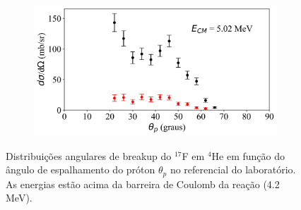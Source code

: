 \documentclass[a4paper,12pt,oneside]{book}
\begin{document}
\begin{figure}[H]
\begin{subfigure}[b]{0.48\textwidth}
        \caption{}
        \label{subfig:dist_ang_f}
    \end{subfigure}
    \begin{subfigure}[b]{0.49\textwidth}
        \centering
        \includegraphics[scale=0.38, width=1.\columnwidth]{figs/dist_angs/dist_ang_6.png}
        \caption{}
        \label{subfig:dist_ang_g}
    \end{subfigure}
\caption{Distribuições angulares de breakup do $^{17}$F em $^4$He em função do ângulo de espalhamento do próton $\theta_p$ no referencial do laboratório. As energias estão acima da barreira de Coulomb da reação (4.2 MeV).}
\label{fig:dist_ang_acima}
\end{figure}
\end{document}
